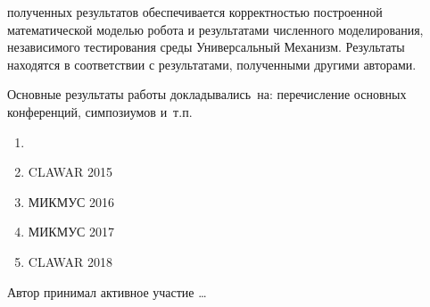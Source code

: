 
{\reliability} полученных результатов обеспечивается корректностью построенной математической моделью робота и результатами численного моделирования, независимого тестирования среды Универсальный Механизм. Результаты находятся в соответствии с результатами, полученными другими авторами.

{\probation}
Основные результаты работы докладывались~на:
перечисление основных конференций, симпозиумов и~т.\:п.

\begin{enumerate}
  \item {}
  \item CLAWAR 2015 
  \item МИКМУС 2016 
  \item МИКМУС 2017 
  \item CLAWAR 2018 
\end{enumerate}

{\contribution} Автор принимал активное участие \ldots


